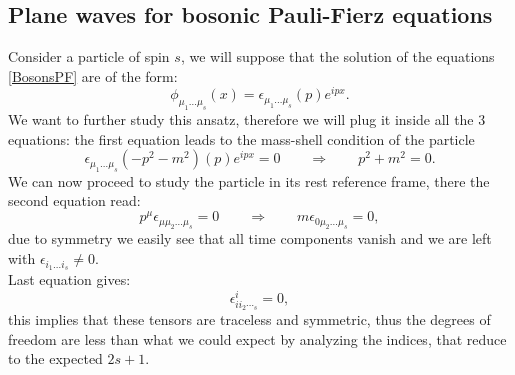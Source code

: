 \subsection{Plane waves for bosonic Pauli-Fierz equations}
Consider a particle of spin $s$, we will suppose that the solution of the equations \eqref{BosonsPF} are of the form:
\begin{equation*}
    \phi_{\mu_1\dots\mu_s} (x)=\epsilon_{\mu_1\dots\mu_s}(p)e^{ipx}.
\end{equation*}
We want to further study this ansatz, therefore we will plug it inside all the 3 equations: the first equation leads to the mass-shell condition of the particle
\begin{equation*}
    \epsilon_{\mu_1\dots\mu_s}(-p^2-m^2)(p)e^{ipx}=0\qquad\Rightarrow\qquad p^2+m^2=0.
\end{equation*}
We can now proceed to study the particle in its rest reference frame, there the second equation read:
\begin{equation*}
    p^\mu\epsilon_{\mu\mu_2\dots\mu_s}=0 \qquad\Rightarrow\qquad m\epsilon_{0\mu_2\dots\mu_s}=0,
\end{equation*}
due to symmetry we easily see that all time components vanish and we are left with $\epsilon_{i_1\dots i_s}\neq0$.\\Last equation gives:
\begin{equation*}
    \epsilon^i_{ii_2\dotsi_s}=0, 
\end{equation*}
this implies that these tensors are traceless and symmetric, thus the degrees of freedom are less than what we could expect by analyzing the indices, that reduce to the expected $2s+1$.  
